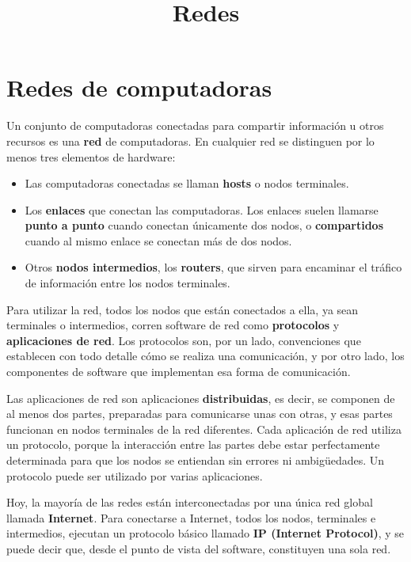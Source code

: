 \documentclass[spanish,A4,]{article}
\title{Redes}
\begin{document}
\maketitle

\section{Redes de computadoras}\label{redes-de-computadoras}

Un conjunto de computadoras conectadas para compartir información u
otros recursos es una \textbf{red} de computadoras. En cualquier red se
distinguen por lo menos tres elementos de hardware:

\begin{itemize}
\itemsep1pt\parskip0pt
\item
  Las computadoras conectadas se llaman \textbf{hosts} o nodos
  terminales.
\item
  Los \textbf{enlaces} que conectan las computadoras. Los enlaces suelen
  llamarse \textbf{punto a punto} cuando conectan únicamente dos nodos,
  o \textbf{compartidos} cuando al mismo enlace se conectan más de dos
  nodos.
\item
  Otros \textbf{nodos intermedios}, los \textbf{routers}, que sirven
  para encaminar el tráfico de información entre los nodos terminales.
\end{itemize}

Para utilizar la red, todos los nodos que están conectados a ella, ya
sean terminales o intermedios, corren software de red como
\textbf{protocolos} y \textbf{aplicaciones de red}. Los protocolos son,
por un lado, convenciones que establecen con todo detalle cómo se
realiza una comunicación, y por otro lado, los componentes de software
que implementan esa forma de comunicación.

Las aplicaciones de red son aplicaciones \textbf{distribuidas}, es
decir, se componen de al menos dos partes, preparadas para comunicarse
unas con otras, y esas partes funcionan en nodos terminales de la red
diferentes. Cada aplicación de red utiliza un protocolo, porque la
interacción entre las partes debe estar perfectamente determinada para
que los nodos se entiendan sin errores ni ambigüedades. Un protocolo
puede ser utilizado por varias aplicaciones.

Hoy, la mayoría de las redes están interconectadas por una única red
global llamada \textbf{Internet}. Para conectarse a Internet, todos los
nodos, terminales e intermedios, ejecutan un protocolo básico llamado
\textbf{IP (Internet Protocol)}, y se puede decir que, desde el punto de
vista del software, constituyen una sola red.
\end{document}
